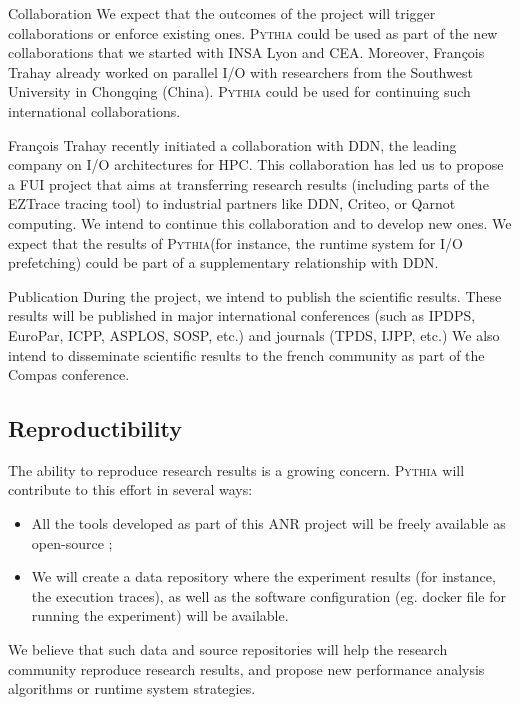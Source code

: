 \documentclass[a4paper,11pt,defblank]{article}
\newcommand{\todo}[1]{\mynote{TODO}{#1}}
\newcommand{\pname}{\textsc{Pythia}\xspace}
\begin{document}
\begin{paragraph}{Collaboration}
  We expect that the outcomes of the project will trigger collaborations
  or enforce existing ones. \pname could be used as part of the new
  collaborations that we started with INSA Lyon and CEA.
  Moreover, François Trahay already worked on parallel I/O
  \cite{prefetch_liao} with researchers from the Southwest University in
  Chongqing (China). \pname could be used for continuing such
  international collaborations.

  François Trahay recently initiated a collaboration with DDN, the
  leading company on I/O architectures for HPC. This collaboration has
  led us to propose a FUI project that aims at transferring research
  results (including parts of the EZTrace tracing tool) to industrial
  partners like DDN, Criteo, or Qarnot computing. We intend to
  continue this collaboration and to develop new ones. We expect that
  the results of \pname (for instance, the runtime system for I/O
  prefetching) could be part of a supplementary relationship with DDN.
\end{paragraph}

\begin{paragraph}{Publication}
  During the project, we intend to publish the scientific results.
  These results will be published in major international conferences
  (such as IPDPS, EuroPar, ICPP, ASPLOS, SOSP, etc.) and journals
  (TPDS, IJPP, etc.) We also intend to disseminate scientific results
  to the french community as part of the Compas conference. \todo{a
    garder ?}
\end{paragraph}

\subsection{Reproductibility}

The ability to reproduce research results is a growing
concern. \pname will contribute to this effort in several ways:
\begin{itemize}
\item All the tools developed as part of this ANR project will be freely available as open-source ;
\item We will create a data repository where the experiment results
  (for instance, the execution traces), as well as the software
  configuration (eg. docker file for running the experiment) will be
  available.
\end{itemize}

We believe that such data and source repositories will help the
research community reproduce research results, and propose new
performance analysis algorithms or runtime system strategies.




{}


\end{document}
